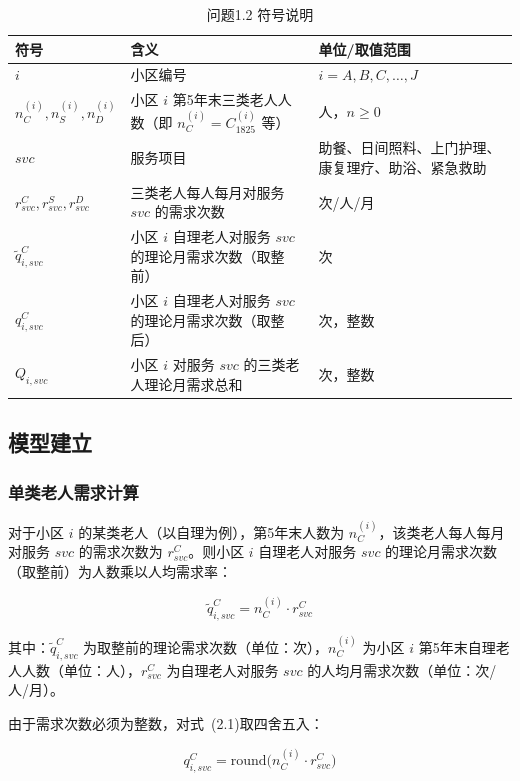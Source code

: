 \documentclass[12pt,a4paper]{article}
\begin{document}
\begin{table}[htbp]
\centering
\caption{问题1.2 符号说明}
\label{tab:symbols_1.2}
\begin{tabular}{@{} l p{4.5cm} p{3.5cm} @{}}
\toprule
符号 & 含义 & 单位/取值范围 \\
\midrule
$i$ & 小区编号 & $i = A, B, C, \ldots, J$ \\
$n_C^{(i)}, n_S^{(i)}, n_D^{(i)}$ & 小区 $i$ 第5年末三类老人人数（即 $n_C^{(i)} = C_{1825}^{(i)}$ 等） & 人，$n \geq 0$ \\
$svc$ & 服务项目 & 助餐、日间照料、上门护理、康复理疗、助浴、紧急救助 \\
$r_{svc}^C, r_{svc}^S, r_{svc}^D$ & 三类老人每人每月对服务 $svc$ 的需求次数 & 次/人/月 \\
$\tilde{q}_{i,svc}^C$ & 小区 $i$ 自理老人对服务 $svc$ 的理论月需求次数（取整前） & 次 \\
$q_{i,svc}^C$ & 小区 $i$ 自理老人对服务 $svc$ 的理论月需求次数（取整后） & 次，整数 \\
$Q_{i,svc}$ & 小区 $i$ 对服务 $svc$ 的三类老人理论月需求总和 & 次，整数 \\
\bottomrule
\end{tabular}
\end{table}

\subsection{模型建立}

\subsubsection{单类老人需求计算}

对于小区 $i$ 的某类老人（以自理为例），第5年末人数为 $n_C^{(i)}$，该类老人每人每月对服务 $svc$ 的需求次数为 $r_{svc}^C$。则小区 $i$ 自理老人对服务 $svc$ 的理论月需求次数（取整前）为人数乘以人均需求率：

\begin{equation}
\tilde{q}_{i,svc}^C = n_C^{(i)} \cdot r_{svc}^C
\tag{2.1}
\end{equation}

其中：$\tilde{q}_{i,svc}^C$ 为取整前的理论需求次数（单位：次），$n_C^{(i)}$ 为小区 $i$ 第5年末自理老人人数（单位：人），$r_{svc}^C$ 为自理老人对服务 $svc$ 的人均月需求次数（单位：次/人/月）。

由于需求次数必须为整数，对式~(2.1)取四舍五入：

\begin{equation}
q_{i,svc}^C = \text{round}\bigl(n_C^{(i)} \cdot r_{svc}^C\bigr)
\tag{2.2}
\end{equation}
\end{document}
